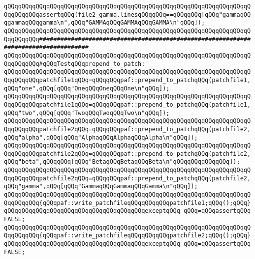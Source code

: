 \verb|qQQqqQQqqQQqqQQqqQQqqQQqqQQqqQQqqQQqqQQqqQQqqQQqqQQqqQQqqQQqqQQqqQQqqQQqqQQqqQQqassertqQQq(file2_gamma.linesqQQqqQQq==qQQqqQQq[qQQq"gammaqQQqgammaqQQqgamma\n",qQQq"GAMMAqQQqGAMMAqQQqGAMMA\n"qQQq]);|\newline
\newline
\newline
\verb|qQQqqQQqqQQqqQQqqQQqqQQqqQQqqQQqqQQqqQQqqQQqqQQqqQQqqQQqqQQqqQQqqQQqqQQqqQQqqQQq####################################################################################|\newline
\verb|qQQqqQQqqQQqqQQqqQQqqQQqqQQqqQQqqQQqqQQqqQQqqQQqqQQqqQQqqQQqqQQqqQQqqQQqqQQqqQQq#qQQqTestqQQqprepend_to_patch:|\newline
\newline
\verb|qQQqqQQqqQQqqQQqqQQqqQQqqQQqqQQqqQQqqQQqqQQqqQQqqQQqqQQqqQQqqQQqqQQqqQQqqQQqqQQqpatchfile1qQQq=qQQqqQQqpaf::prepend_to_patchqQQq(patchfile1,qQQq"one",qQQq[qQQq"OneqQQqOneqQQqOne\n"qQQq]);|\newline
\verb|qQQqqQQqqQQqqQQqqQQqqQQqqQQqqQQqqQQqqQQqqQQqqQQqqQQqqQQqqQQqqQQqqQQqqQQqqQQqqQQqpatchfile1qQQq=qQQqqQQqpaf::prepend_to_patchqQQq(patchfile1,qQQq"two",qQQq[qQQq"TwoqQQqTwoqQQqTwo\n"qQQq]);|\newline
\newline
\verb|qQQqqQQqqQQqqQQqqQQqqQQqqQQqqQQqqQQqqQQqqQQqqQQqqQQqqQQqqQQqqQQqqQQqqQQqqQQqqQQqpatchfile2qQQq=qQQqqQQqpaf::prepend_to_patchqQQq(patchfile2,qQQq"alpha",qQQq[qQQq"AlphaqQQqAlphaqQQqAlpha\n"qQQq]);|\newline
\verb|qQQqqQQqqQQqqQQqqQQqqQQqqQQqqQQqqQQqqQQqqQQqqQQqqQQqqQQqqQQqqQQqqQQqqQQqqQQqqQQqpatchfile2qQQq=qQQqqQQqpaf::prepend_to_patchqQQq(patchfile2,qQQq"beta",qQQqqQQq[qQQq"BetaqQQqBetaqQQqBeta\n"qQQqqQQqqQQqqQQq]);|\newline
\verb|qQQqqQQqqQQqqQQqqQQqqQQqqQQqqQQqqQQqqQQqqQQqqQQqqQQqqQQqqQQqqQQqqQQqqQQqqQQqqQQqpatchfile2qQQq=qQQqqQQqpaf::prepend_to_patchqQQq(patchfile2,qQQq"gamma",qQQq[qQQq"GammaqQQqGammaqQQqGamma\n"qQQq]);|\newline
\newline
\verb|qQQqqQQqqQQqqQQqqQQqqQQqqQQqqQQqqQQqqQQqqQQqqQQqqQQqqQQqqQQqqQQqqQQqqQQqqQQqqQQq{qQQqpaf::write_patchfileqQQqqQQqqQQqpatchfile1;qQQq();qQQq}qQQqqQQqqQQqqQQqqQQqqQQqqQQqqQQqqQQqqQQqexceptqQQq_qQQq=qQQqassertqQQqFALSE;|\newline
\verb|qQQqqQQqqQQqqQQqqQQqqQQqqQQqqQQqqQQqqQQqqQQqqQQqqQQqqQQqqQQqqQQqqQQqqQQqqQQqqQQq{qQQqpaf::write_patchfileqQQqqQQqqQQqpatchfile2;qQQq();qQQq}qQQqqQQqqQQqqQQqqQQqqQQqqQQqqQQqqQQqqQQqexceptqQQq_qQQq=qQQqassertqQQqFALSE;|\newline
